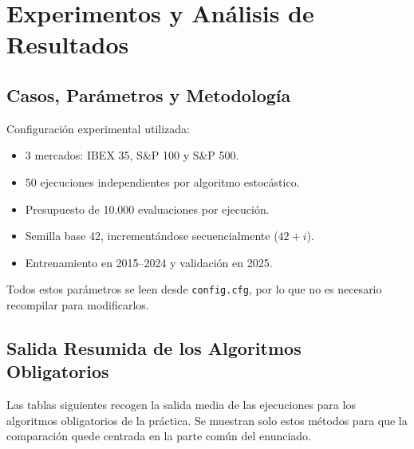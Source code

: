\newpage
\section{Experimentos y Análisis de Resultados}
\label{sec:experimentos}

\subsection{Casos, Parámetros y Metodología}

Configuración experimental utilizada:

\begin{itemize}[noitemsep]
    \item 3 mercados: IBEX 35, S\&P 100 y S\&P 500.
    \item 50 ejecuciones independientes por algoritmo estocástico.
    \item Presupuesto de 10.000 evaluaciones por ejecución.
    \item Semilla base 42, incrementándose secuencialmente ($42+i$).
    \item Entrenamiento en 2015--2024 y validación en 2025.
\end{itemize}

Todos estos parámetros se leen desde \texttt{config.cfg}, por lo que no es
necesario recompilar para modificarlos.

\subsection{Salida Resumida de los Algoritmos Obligatorios}

Las tablas siguientes recogen la salida media de las ejecuciones para los
algoritmos obligatorios de la práctica. Se muestran solo estos métodos para que
la comparación quede centrada en la parte común del enunciado.

